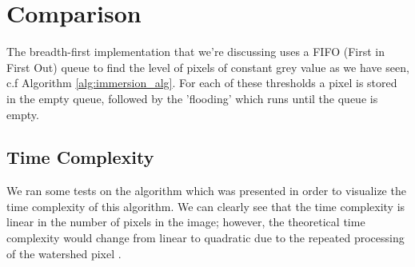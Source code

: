 \documentclass{article}
\begin{document}
\section{Comparison}
The breadth-first implementation that we're discussing uses a FIFO (First in First Out) queue to find the level of pixels of constant grey value as we have seen, c.f Algorithm \ref{alg:immersion_alg}. For each of these thresholds a pixel is stored in the empty queue, followed by the 'flooding' which runs until the queue is empty. 
\subsection{Time Complexity}

\begin{flushleft}
We ran some tests on the algorithm which was presented in order to visualize the time complexity of this algorithm. 
We can clearly see that the time complexity is linear in the number of pixels in the image; however, 
the theoretical time complexity would change from linear to quadratic due to the repeated processing of the watershed pixel \cite{timecomplexity}.
\end{flushleft}
\end{document}
